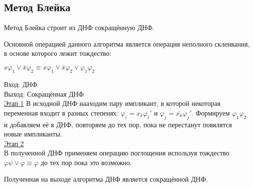 \subsection {Метод Блейка}
Метод Блейка строит из ДНФ сокращённую ДНФ.\par
Основной операцией данного алгоритма является операция неполного склеивания, в основе которого лежит тождество:
\begin{center}
	$x\varphi_1 \vee \bar{x}\varphi_2 \equiv x\varphi_1 \vee \bar{x}\varphi_2 \vee \varphi_1\varphi_2$
\end{center}
Вход: ДНФ\\
Выход: Сокращённая ДНФ\\
\underline{Этап 1}
В исходной ДНФ нааходим пару импликант, в которой некоторая переменная входит в разных степенях: $\varphi_i = x_k\varphi_i'$ и $\varphi_j = \overline{x_k}\varphi_j'$.
Формируем $\varphi_1\varphi_2$ и добавляем её в ДНФ, повторяем до тех пор, пока не перестанут повялятся новые импликанты.\\
\underline{Этап 2}\\
В полученной ДНФ применяем операцию поглощения используя тождество $\varphi\psi\vee\varphi\equiv\varphi$ до тех пор пока это возможно.

\thr Полученная на выходе алгоритма ДНФ является сокращённой ДНФ.

